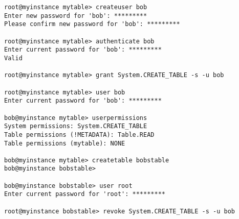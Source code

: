 \small
\begin{verbatim}
root@myinstance mytable> createuser bob
Enter new password for 'bob': *********
Please confirm new password for 'bob': *********

root@myinstance mytable> authenticate bob
Enter current password for 'bob': *********
Valid

root@myinstance mytable> grant System.CREATE_TABLE -s -u bob

root@myinstance mytable> user bob
Enter current password for 'bob': *********

bob@myinstance mytable> userpermissions
System permissions: System.CREATE_TABLE
Table permissions (!METADATA): Table.READ
Table permissions (mytable): NONE

bob@myinstance mytable> createtable bobstable
bob@myinstance bobstable>

bob@myinstance bobstable> user root
Enter current password for 'root': *********

root@myinstance bobstable> revoke System.CREATE_TABLE -s -u bob
\end{verbatim}
\normalsize

